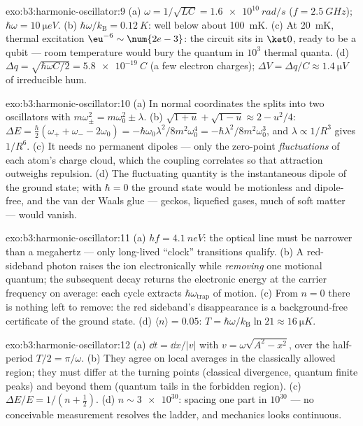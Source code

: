 \begin{solution}{exo:b3:harmonic-oscillator:9}
(a) $\omega = 1/\sqrt{LC} = \qty{1.6e10}{rad/s}$ ($f =
\qty{2.5}{GHz}$); $\hbar\omega = \qty{10}{\micro eV}$. (b)
$\hbar\omega/k_{\text{B}} = \qty{0.12}{K}$: well below about
\qty{100}{mK}. (c) At \qty{20}{mK}, thermal excitation
$\eu^{-6} \sim \num{2e-3}$: the circuit sits in $\ket0$, ready to
be a qubit --- room temperature would bury the quantum in $10^3$
thermal quanta. (d) $\Delta q = \sqrt{\hbar\omega C/2} =
\qty{5.8e-19}{C}$ (a few electron charges); $\Delta V = \Delta q/C
\approx \qty{1.4}{\micro V}$ of irreducible hum.
\end{solution}

\begin{solution}{exo:b3:harmonic-oscillator:10}
(a) In normal coordinates the  splits into two
oscillators with $m\omega_\pm^2 = m\omega_0^2 \pm \lambda$. (b)
$\sqrt{1 + u} + \sqrt{1 - u} \approx 2 - u^2/4$: $\Delta E =
\tfrac\hbar2(\omega_+ + \omega_- - 2\omega_0) =
-\hbar\omega_0\lambda^2/8m^2\omega_0^4 =
-\hbar\lambda^2/8m^2\omega_0^3$, and $\lambda \propto 1/R^3$ gives
$1/R^6$. (c) It needs no permanent dipoles --- only the zero-point
\emph{fluctuations} of each atom's charge cloud, which the coupling
correlates so that attraction outweighs repulsion. (d) The
fluctuating quantity is the instantaneous dipole of the ground
state; with $\hbar = 0$ the ground state would be motionless and
dipole-free, and the van der Waals glue --- geckos, liquefied
gases, much of soft matter --- would vanish.
\end{solution}

\begin{solution}{exo:b3:harmonic-oscillator:11}
(a) $hf = \qty{4.1}{neV}$: the optical line must be narrower than a
megahertz --- only long-lived ``clock'' transitions qualify. (b)
A red-sideband photon raises the ion electronically while
\emph{removing} one motional quantum; the subsequent decay returns
the electronic energy at the carrier frequency on average: each
cycle extracts $\hbar\omega_{\text{trap}}$ of motion. (c) From $n = 0$
there is nothing left to remove: the red sideband's disappearance is
a background-free certificate of the ground state. (d)
$\langle n\rangle = 0.05$: $T = \hbar\omega/k_{\text{B}}\ln21
\approx \qty{16}{\micro K}$.
\end{solution}

\begin{solution}{exo:b3:harmonic-oscillator:12}
(a) $\dd t = \dd x/|v|$ with $v = \omega\sqrt{A^2 - x^2}$, over the
half-period $T/2 = \pi/\omega$. (b) They agree on local averages in
the classically allowed region; they must differ at the turning
points (classical divergence, quantum finite peaks) and beyond them
(quantum tails in the forbidden region). (c) $\Delta E/E = 1/(n +
\tfrac12)$. (d) $n \sim \num{3e30}$: spacing one part in $10^{30}$
--- no conceivable measurement resolves the ladder, and mechanics
looks continuous.
\end{solution}

